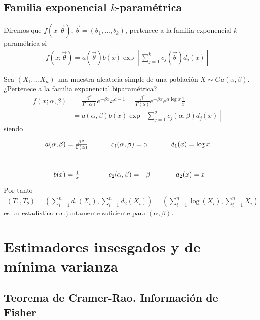 \subsection{Familia exponencial $k$-paramétrica}

\begin{defi}
Diremos que $f\left(x;\overrightarrow{\theta}\right)$, $\overrightarrow{\theta} = (\theta_1,...,\theta_k)$, pertenece a la familia exponencial $k$-paramétrica si
\begin{align*}
    f(x;\overrightarrow{\theta}) = a\left(\overrightarrow{\theta}\right)b(x)\exp\left[ \sum_{j=1}^{k}{c_j\left(\overrightarrow{\theta}\right)d_j(x)}\right]
\end{align*}
\end{defi}

\begin{ejemplo}
Sea $(X_1,...X_n)$ una muestra aleatoria simple de una población $X \sim Ga(\alpha,\beta)$. ¿Pertenece a la familia exponencial biparamétrica?
\begin{align*}
    f(x;\alpha,\beta) &= \frac{\beta^{\alpha}}{\Gamma(\alpha)}e^{-\beta x}x^{\alpha -1} = \frac{\beta^{\alpha}}{\Gamma(\alpha)}e^{-\beta x}e^{\alpha\log x} \frac{1}{x} \\
    &= a\left(\alpha,\beta\right)b(x)\exp\left[ \sum_{j=1}^{2}{c_j\left(\alpha,\beta\right)d_j(x)}\right]
\end{align*}
siendo
\begin{align*}
    \xymatrix{
    a(\alpha, \beta) =  \frac{\beta^{\alpha}}{\Gamma(\alpha)} & c_1(\alpha,\beta) = \alpha & d_1(x) = \log x \\
    b(x) = \frac{1}{x} & c_2(\alpha,\beta) = -\beta & d_2(x) = x
    }
\end{align*}
Por tanto
\begin{align*}
    (T_1,T_2) = \left( \sum_{i=1}^{n}{d_1(X_i)}, \sum_{i=1}^{n}{d_2(X_i)}\right) = \left( \sum_{i=1}^{n}{\log(X_i)}, \sum_{i=1}^{n}{X_i}\right)
\end{align*}
es un estadístico conjuntamente suficiente para $(\alpha,\beta)$.
\end{ejemplo}

\section{Estimadores insesgados y de mínima varianza}

\subsection{Teorema de Cramer-Rao. Información de Fisher}

